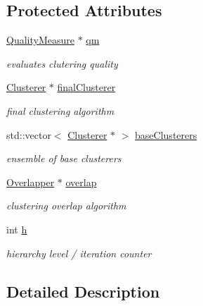 \subsection*{Protected Attributes}
\begin{DoxyCompactItemize}
\item 
\hyperlink{class_networ_kit_1_1_quality_measure}{Quality\-Measure} $\ast$ \hyperlink{class_networ_kit_1_1_ensemble_multilevel_a915aae76cd6660ae3a541d36969ebeea}{qm}
\begin{DoxyCompactList}\small\item\em evaluates clutering quality \end{DoxyCompactList}\item 
\hyperlink{class_networ_kit_1_1_clusterer}{Clusterer} $\ast$ \hyperlink{class_networ_kit_1_1_ensemble_multilevel_a7a6938877c0d0f405b953eda8053c181}{final\-Clusterer}
\begin{DoxyCompactList}\small\item\em final clustering algorithm \end{DoxyCompactList}\item 
std\-::vector$<$ \hyperlink{class_networ_kit_1_1_clusterer}{Clusterer} $\ast$ $>$ \hyperlink{class_networ_kit_1_1_ensemble_multilevel_a0bd8b22ab79760c4839e77e37ed553f5}{base\-Clusterers}
\begin{DoxyCompactList}\small\item\em ensemble of base clusterers \end{DoxyCompactList}\item 
\hyperlink{class_networ_kit_1_1_overlapper}{Overlapper} $\ast$ \hyperlink{class_networ_kit_1_1_ensemble_multilevel_a4b3abd511fb680656839a9fc9b02c5db}{overlap}
\begin{DoxyCompactList}\small\item\em clustering overlap algorithm \end{DoxyCompactList}\item 
int \hyperlink{class_networ_kit_1_1_ensemble_multilevel_a4bc6df355537771fcdc186b308232391}{h}
\begin{DoxyCompactList}\small\item\em hierarchy level / iteration counter \end{DoxyCompactList}\end{DoxyCompactItemize}


\subsection{Detailed Description}


